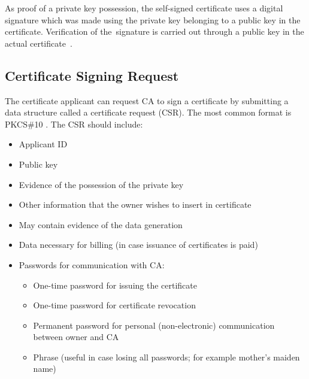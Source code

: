 \documentclass[
  oneside, 12pt, 
  printed, %
  notable,   %
  nolof,     %
  nolot,     %
]{fithesis3}
\begin{document}
As proof of a private key possession, the self-signed certificate uses a digital signature which 
was made using the private key belonging to a public key in the certificate. Verification of 
the~signature is carried out through a public key in the actual 
certificate~\cite{dostalek2016velky}.

\subsection{Certificate Signing Request}
The certificate applicant can request CA to sign a certificate by submitting a data structure called 
a certificate request (CSR). The most common format is PKCS\#10 \cite{dostalek2016velky}. The CSR 
should include:
\begin{itemize}[leftmargin=2em,rightmargin=1em,itemsep=0.75\parskip,parsep=0em,topsep=0em,partopsep=0em]
\item Applicant ID
\item Public key
\item Evidence of the possession of the private key
\item Other information that the owner wishes to insert in certificate
\item May contain evidence of the data generation
\item Data necessary for billing (in case issuance of certificates is paid)
\item Passwords for communication with CA:
  \begin{itemize}[leftmargin=2em,rightmargin=1em,itemsep=0.75\parskip,parsep=0em,topsep=0em,partopsep=0em]
  \item One-time password for issuing the certificate
  \item One-time password for certificate revocation
  \item Permanent password for personal (non-electronic) communication between owner and CA
  \item Phrase (useful in case losing all passwords; for example mother's maiden name) 
  \end{itemize}
\end{itemize} 
\end{document}
